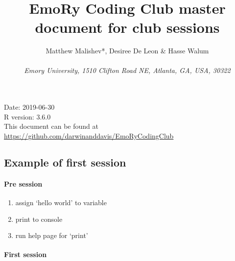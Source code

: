 \documentclass[10,portrait]{article}
\title{EmoRy Coding Club master document for club sessions}
\author{Matthew Malishev*, Desiree De Leon \& Hasse Walum\\
~\\
\emph{Emory University, 1510 Clifton Road NE, Atlanta, GA, USA, 30322}}
\date{}
\newenvironment{Shaded}{\begin{snugshade}}{\end{snugshade}}
\newcommand{\KeywordTok}[1]{\textcolor[rgb]{0.13,0.29,0.53}{\textbf{#1}}}
\newcommand{\NormalTok}[1]{#1}
\newcommand{\OperatorTok}[1]{\textcolor[rgb]{0.81,0.36,0.00}{\textbf{#1}}}
\newcommand{\StringTok}[1]{\textcolor[rgb]{0.31,0.60,0.02}{#1}}
\providecommand{\tightlist}{%
  \setlength{\itemsep}{0pt}\setlength{\parskip}{0pt}}
\let\oldparagraph\paragraph
\renewcommand{\paragraph}[1]{\oldparagraph{#1}\mbox{}}
\begin{document}
\maketitle

{
\hypersetup{linkcolor=}
\setcounter{tocdepth}{3}
\tableofcontents
}
\newpage

Date: 2019-06-30\\
R version: 3.6.0\\
This document can be found at
\url{https://github.com/darwinanddavis/EmoRyCodingClub}

\newpage

\hypertarget{example-of-first-session}{%
\subsection{Example of first session}\label{example-of-first-session}}

\hypertarget{pre-session}{%
\paragraph{Pre session}\label{pre-session}}

\begin{enumerate}
\def\labelenumi{\arabic{enumi}.}
\tightlist
\item
  assign `hello world' to variable\\
\item
  print to console\\
\item
  run help page for `print'
\end{enumerate}

\hypertarget{first-session}{%
\paragraph{First session}\label{first-session}}

\begin{Shaded}
\end{Shaded}
\end{document}
